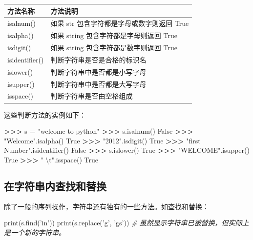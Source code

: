 \documentclass[]{ctexbook}
\newenvironment{Shaded}{\begin{snugshade}}{\end{snugshade}}
\newcommand{\BuiltInTok}[1]{#1}
\newcommand{\CharTok}[1]{\textcolor[rgb]{0.31,0.60,0.02}{#1}}
\newcommand{\CommentTok}[1]{\textcolor[rgb]{0.56,0.35,0.01}{\textit{#1}}}
\newcommand{\NormalTok}[1]{#1}
\newcommand{\OperatorTok}[1]{\textcolor[rgb]{0.81,0.36,0.00}{\textbf{#1}}}
\newcommand{\StringTok}[1]{\textcolor[rgb]{0.31,0.60,0.02}{#1}}
\newcommand{\VariableTok}[1]{\textcolor[rgb]{0.00,0.00,0.00}{#1}}
\begin{document}
\begin{longtable}[]{@{}ll@{}}
\toprule
方法名称 & 方法说明\tabularnewline
\midrule
\endhead
isalnum() & 如果 str 包含字符都是字母或数字则返回 True\tabularnewline
isalpha() & 如果 string 包含字符都是字母则返回 True\tabularnewline
isdigit() & 如果 string 包含字符都是数字则返回 True\tabularnewline
isidentifier() & 判断字符串是否是合格的标识名\tabularnewline
islower() & 判断字符串中是否都是小写字母\tabularnewline
isupper() & 判断字符串中是否都是大写字母\tabularnewline
isspace() & 判断字符串是否由空格组成\tabularnewline
\bottomrule
\end{longtable}

这些判断方法的实例如下：

\begin{Shaded}
\begin{Highlighting}[]
\OperatorTok{>>>}\NormalTok{ s }\OperatorTok{=} \StringTok{"welcome to python"}
\OperatorTok{>>>}\NormalTok{ s.isalnum()}
\VariableTok{False}
\OperatorTok{>>>} \StringTok{"Welcome"}\NormalTok{.isalpha()}
\VariableTok{True}
\OperatorTok{>>>} \StringTok{"2012"}\NormalTok{.isdigit()}
\VariableTok{True}
\OperatorTok{>>>} \StringTok{"first Number"}\NormalTok{.isidentifier()}
\VariableTok{False}
\OperatorTok{>>>}\NormalTok{ s.islower()}
\VariableTok{True}
\OperatorTok{>>>} \StringTok{"WELCOME"}\NormalTok{.isupper()}
\VariableTok{True}
\OperatorTok{>>>} \StringTok{"  }\CharTok{\textbackslash{}t}\StringTok{"}\NormalTok{.isspace()}
\VariableTok{True}
\end{Highlighting}
\end{Shaded}

\hypertarget{ux5728ux5b57ux7b26ux4e32ux5185ux67e5ux627eux548cux66ffux6362}{%
\subsection{在字符串内查找和替换}\label{ux5728ux5b57ux7b26ux4e32ux5185ux67e5ux627eux548cux66ffux6362}}

除了一般的序列操作，字符串还有独有的一些方法。如查找和替换：

\begin{Shaded}
\begin{Highlighting}[]
\BuiltInTok{print}\NormalTok{(s.find(}\StringTok{'in'}\NormalTok{))}
\BuiltInTok{print}\NormalTok{(s.replace(}\StringTok{'g'}\NormalTok{, }\StringTok{'gs'}\NormalTok{))  }\CommentTok{# 虽然显示字符串已被替换，但实际上是一个新的字符串。}
\end{Highlighting}
\end{Shaded}
\end{document}

